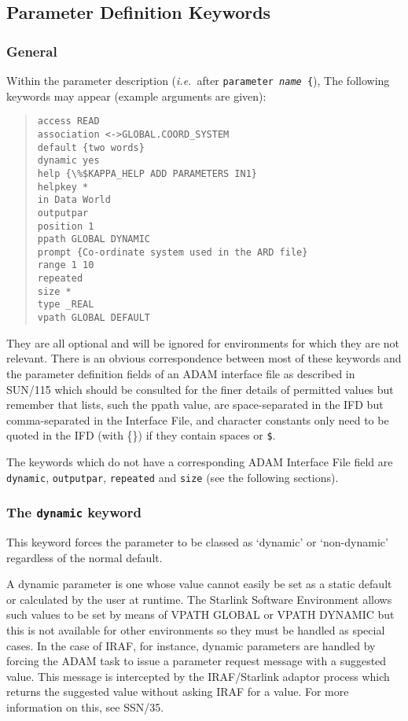 \documentclass[twoside,11pt]{article}
\newcommand{\htmlref}[2]{#1}
\newcommand{\xref}[3]{#1}
\newcommand{\xlabel}[1]{}
\newcommand{\latex}[1]{#1}
\begin{document}
\subsection{\xlabel{parameter_definition_keywords}Parameter Definition Keywords}
\subsubsection{\xlabel{general}General}
Within the parameter description
(\textit{i.e.}\ after \texttt{parameter \textit{name} \{}), The following
keywords may appear (example arguments are given):
\begin{quote} \begin{verbatim}
access READ
association <->GLOBAL.COORD_SYSTEM
default {two words}
dynamic yes
help {\%$KAPPA_HELP ADD PARAMETERS IN1}
helpkey *
in Data World
outputpar
position 1
ppath GLOBAL DYNAMIC
prompt {Co-ordinate system used in the ARD file}
range 1 10
repeated
size *
type _REAL
vpath GLOBAL DEFAULT
\end{verbatim} \end{quote}
They are all optional and will be ignored for environments for which they are
not relevant. There is an obvious correspondence between most of these
keywords and the parameter definition fields of an ADAM interface file as
described in
\xref{SUN/115}{sun115}{}
which should be consulted for the finer details of permitted values but
remember that lists, such the ppath value, are space-separated in the IFD but
comma-separated in the Interface File, and character constants only need to be
quoted in the IFD (with \{\}) if they contain spaces or \texttt{\$}.

The keywords which do not have a corresponding ADAM Interface File field
are
\htmlref{\texttt{dynamic}}{dynamic_key},
\htmlref{\texttt{outputpar}}{outputpar_key},
\htmlref{\texttt{repeated}}{repeated_key}
and
\htmlref{\texttt{size}}{size_key}\latex{ (see the following sections)}.

\subsubsection{\xlabel{the_dynamic_keyword}\label{dynamic_key}The
\texttt{dynamic} keyword}
This keyword forces the parameter to be classed as `dynamic' or `non-dynamic'
regardless of the normal default.

A dynamic parameter is one whose value cannot
easily be set as a static default or calculated by the user at runtime.
The Starlink Software Environment allows such values to be set by means of
VPATH GLOBAL or VPATH DYNAMIC but this is not available for other environments
so they must be handled as special cases. In the case of IRAF, for instance,
dynamic parameters are handled by forcing the ADAM task to issue a parameter
request message with a suggested value. This message is intercepted by the
\xref{IRAF/Starlink adaptor process}{ssn35}{the_adaptor_process}
which returns the suggested value without asking IRAF for a value.
For more information on this, see
\xref{SSN/35}{ssn35}{dynamic_parameters}.
\end{document}
